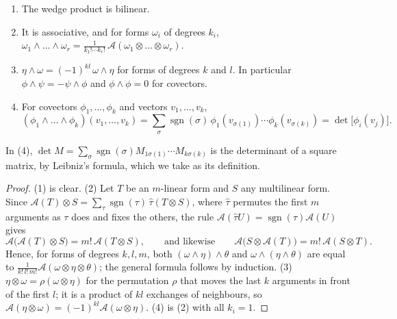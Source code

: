 \begin{notechapter}
\begin{theorem}
\label{multilinear-algebra:thm:wedge}
\begin{enumerate}[nosep]
  \item The wedge product is bilinear.
  \item It is associative, and for forms $\omega_i$ of degrees $k_i$,
        $\omega_1\wedge\dots\wedge\omega_r
        = \frac1{k_1!\cdots k_r!}\,
        \mathcal A(\omega_1\otimes\dots\otimes\omega_r)$.
  \item $\eta\wedge\omega = (-1)^{kl}\,\omega\wedge\eta$ for forms of
        degrees $k$ and $l$. In particular
        $\phi\wedge\psi = -\psi\wedge\phi$ and $\phi\wedge\phi = 0$ for
        covectors.
  \item For covectors $\phi_1,\dots,\phi_k$ and vectors
        $v_1,\dots,v_k$,
        \[
          (\phi_1\wedge\dots\wedge\phi_k)(v_1,\dots,v_k)
          = \sum_\sigma\operatorname{sgn}(\sigma)\,
            \phi_1(v_{\sigma(1)})\cdots\phi_k(v_{\sigma(k)})
          = \det\bigl[\phi_i(v_j)\bigr] .
        \]
\end{enumerate}
\end{theorem}

In (4), $\det M = \sum_\sigma\operatorname{sgn}(\sigma)
M_{1\sigma(1)}\cdots M_{k\sigma(k)}$ is the determinant of a square
matrix, by Leibniz's formula, which we take as its definition.

\begin{proof}
(1) is clear. (2) Let $T$ be an $m$-linear form and $S$ any multilinear
form. Since
$\mathcal A(T)\otimes S
= \sum_\tau\operatorname{sgn}(\tau)\,\hat\tau(T\otimes S)$, where
$\hat\tau$ permutes the first $m$ arguments as $\tau$ does and fixes
the others, the rule
$\mathcal A(\hat\tau U) = \operatorname{sgn}(\tau)\mathcal A(U)$ gives
\[
  \mathcal A\bigl(\mathcal A(T)\otimes S\bigr)
  = m!\,\mathcal A(T\otimes S) ,
  \qquad\text{and likewise}\qquad
  \mathcal A\bigl(S\otimes\mathcal A(T)\bigr)
  = m!\,\mathcal A(S\otimes T) .
\]
Hence, for forms of degrees $k, l, m$, both
$(\omega\wedge\eta)\wedge\theta$ and $\omega\wedge(\eta\wedge\theta)$
are equal to
$\frac1{k!\,l!\,m!}\mathcal A(\omega\otimes\eta\otimes\theta)$; the
general formula follows by induction. (3)
$\eta\otimes\omega = \rho(\omega\otimes\eta)$ for the permutation
$\rho$ that moves the last $k$ arguments in front of the first $l$; it
is a product of $kl$ exchanges of neighbours, so
$\mathcal A(\eta\otimes\omega) = (-1)^{kl}\mathcal A(\omega\otimes\eta)$.
(4) is (2) with all $k_i = 1$.
\end{proof}


\end{notechapter}
